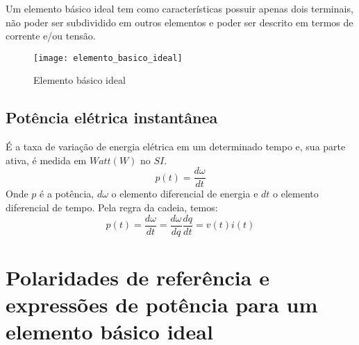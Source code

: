 \documentclass[12pt,fleqn]{book} %
\begin{document}
	             \begin{definition}
	         Um elemento básico ideal tem como características possuir apenas dois terminais, não poder ser subdividido em outros elementos e poder ser descrito em termos de corrente e/ou tensão.
	         
	             \end{definition}
	          \begin{figure}[!htbp]
	              \centering\texttt{[image: elemento\_basico\_ideal]}
	              \caption{Elemento básico ideal}
	          \end{figure}
	
	          \subsection{Potência elétrica instantânea}
	             
	             \begin{definition}
	             É a taxa de variação de energia elétrica em um determinado tempo e, sua parte ativa, é medida em $Watt (W)$ no $SI$.
	             \begin{equation}
	             p(t) = \frac{d\omega}{dt} 
	             \end{equation}
	             Onde $p$ é a potência, $d\omega$ o elemento diferencial de energia e $dt$ o elemento diferencial de tempo.
	             Pela regra da cadeia, temos:
	             \begin{equation}\label{potencia}
	             p(t) = \frac{d\omega}{dt} = \frac{d\omega}{dq}\frac{dq}{dt} = v(t)i(t)
	             \end{equation}
	             
	             \end{definition}
	             
	    \section{Polaridades de referência e expressões de potência para um elemento básico ideal}
	        
\end{document}

